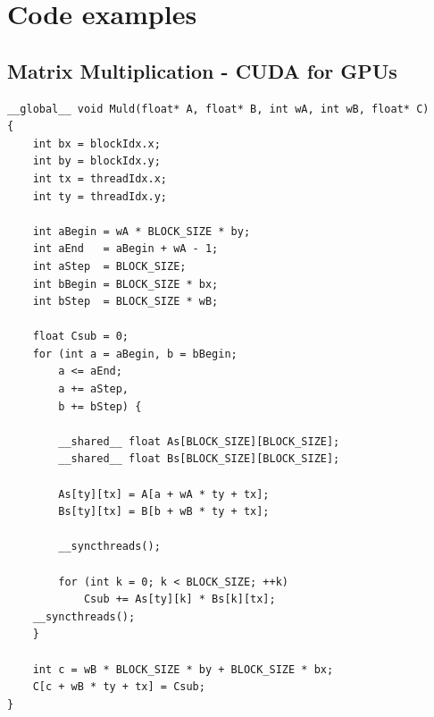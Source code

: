 \appendix
\section{Code examples}
\subsection{Matrix Multiplication - CUDA for GPUs \cite[p. 71]{prog-guide-cuda}}
\label{cuda-matmult}
\lstset{language=java}
\begin{lstlisting}
__global__ void Muld(float* A, float* B, int wA, int wB, float* C) 
{
	int bx = blockIdx.x;     
	int by = blockIdx.y;     
	int tx = threadIdx.x;     
	int ty = threadIdx.y;     

	int aBegin = wA * BLOCK_SIZE * by;     
	int aEnd   = aBegin + wA - 1;     
	int aStep  = BLOCK_SIZE;     
	int bBegin = BLOCK_SIZE * bx;     
	int bStep  = BLOCK_SIZE * wB;     

	float Csub = 0;     
	for (int a = aBegin, b = bBegin;
		a <= aEnd;              
		a += aStep, 
		b += bStep) {         
	
		__shared__ float As[BLOCK_SIZE][BLOCK_SIZE];         
		__shared__ float Bs[BLOCK_SIZE][BLOCK_SIZE];         

		As[ty][tx] = A[a + wA * ty + tx];         
		Bs[ty][tx] = B[b + wB * ty + tx];         

		__syncthreads();         

		for (int k = 0; k < BLOCK_SIZE; ++k) 
			Csub += As[ty][k] * Bs[k][tx];         
	__syncthreads();    
	}     

	int c = wB * BLOCK_SIZE * by + BLOCK_SIZE * bx;     
	C[c + wB * ty + tx] = Csub; 
} 
\end{lstlisting}
